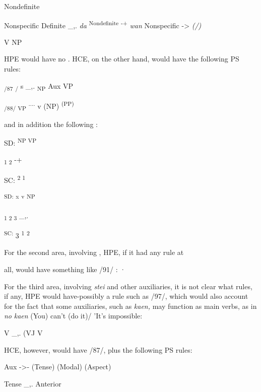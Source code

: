 \glt
\z

\ea\label{ex:95}

\glt
\z

\ea\label{ex:96}

\glt
\z

Nondefinite

Nonspecific Definite \_,. \textit{da} \textsuperscript{Nondefinite }\textsuperscript{{}-+ }\textit{wan} Nonspecific {}-{\textgreater} \textit{(/)}

V NP

HPE would have no . HCE, on the other hand, would have the following PS rules:

\textsubscript{/87}\textsubscript{ }\textsubscript{/ }s \_,. \textsubscript{NP }Aux VP

\textsubscript{/88/ VP}\textsubscript{ }\textsuperscript{.... }v (NP) \textsuperscript{(PP)}

and in addition the following :

\ea\label{ex:89}
SD: \textsuperscript{NP VP}
\glt
\z

\textsubscript{1 2 }{}-+

SC: \textsuperscript{2 1}

\ea\label{ex:90}
 \textsuperscript{SD: }\textsuperscript{x }\textsuperscript{v }\textsuperscript{NP}
\glt
\z

\textsubscript{1 2 3 }\_,.

\textsuperscript{SC: }3 \textsuperscript{1 }\textsuperscript{2}

For the second area, involving , HPE, if it had any rule at

all, would have something like /91/ : ·


For the third area, involving \textit{stei} and other auxiliaries, it is not clear what rules, if any, HPE would have-possibly a rule such as /97/, which would also account for the fact that some auxiliaries, such as \textit{kaen,} may function as main verbs, as in \textit{no} \textit{kaen} (You) can't (do it)/ 'It's impossible:

\ea\label{ex:97}
 V \_,. (VJ V
\glt
\z

HCE, however, would have /87/, plus the following PS rules:

\ea\label{ex:98}
 Aux {}-{\textgreater}- (Tense) (Modal) (Aspect)
\glt
\z

\ea\label{ex:99}
 Tense \_,. Anterior
\glt
\z

